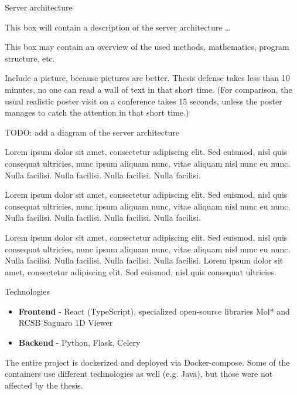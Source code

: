 \documentclass[portrait,a0paper,fontscale=0.25]{baposter}
\begin{document}
\begin{poster}
\begin{posterbox}[column=0, name=architecture, below=goals]{Server architecture}

This box will contain a description of the server architecture \dots

This box may contain an overview of the used methods, mathematics, program structure, etc.

Include a picture, because pictures are better. Thesis defense takes less than 10 minutes, no one can read a wall of text in that short time. (For comparison, the usual realistic poster visit on a conference takes 15 seconds, unless the poster manages to catch the attention in that short time.)

TODO: add a diagram of the server architecture

Lorem ipsum dolor sit amet, consectetur adipiscing elit. Sed euismod, nisl quis
consequat ultricies, nunc ipsum aliquam nunc, vitae aliquam nisl nunc eu
nunc. Nulla facilisi. Nulla facilisi. Nulla facilisi. Nulla facilisi.

Lorem ipsum dolor sit amet, consectetur adipiscing elit. Sed euismod, nisl quis
consequat ultricies, nunc ipsum aliquam nunc, vitae aliquam nisl nunc eu
nunc. Nulla facilisi. Nulla facilisi. Nulla facilisi. Nulla facilisi.

Lorem ipsum dolor sit amet, consectetur adipiscing elit. Sed euismod, nisl quis
consequat ultricies, nunc ipsum aliquam nunc, vitae aliquam nisl nunc eu
nunc. Nulla facilisi. Nulla facilisi. Nulla facilisi. Nulla facilisi.
Lorem ipsum dolor sit amet, consectetur adipiscing elit. Sed euismod, nisl quis
consequat ultricies.


\end{posterbox}

\begin{posterbox}[column=0, name=tech, below=architecture, headerColorOne=yellow!80!orange!95!black, boxColorOne=yellow!33]{Technologies}
\begin{itemize}
	\item \textbf{Frontend} - React (TypeScript), specialized open-source libraries Mol* and RCSB Saguaro 1D Viewer
	\item \textbf{Backend} - Python, Flask, Celery
\end{itemize}
The entire project is dockerized and deployed via Docker-compose. Some of the containers use different
technologies as well (e.g. Java), but those were not affected by the thesis.
\end{posterbox}


\end{poster}
\end{document}
